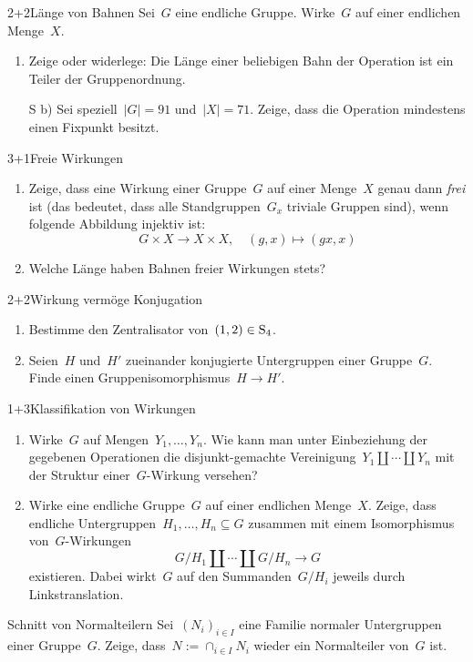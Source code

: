 \documentclass{algblatt}
\begin{document}

\begin{aufgabe}{2+2}{Länge von Bahnen}
Sei~$G$ eine endliche Gruppe. Wirke~$G$ auf einer endlichen Menge~$X$.
\begin{enumerate}
\item Zeige oder widerlege: Die Länge einer beliebigen Bahn der Operation ist
ein Teiler der Gruppenordnung.
\item[S b)]
Sei speziell~$|G| = 91$ und~$|X| = 71$. Zeige, dass die Operation mindestens
einen Fixpunkt besitzt.
\end{enumerate}
\end{aufgabe}

\begin{aufgabe}{3+1}{Freie Wirkungen}
\begin{enumerate}
\item Zeige, dass eine Wirkung einer Gruppe~$G$ auf einer Menge~$X$
genau dann \emph{frei} ist (das bedeutet, dass alle
Standgruppen~$G_x$ triviale Gruppen sind), wenn folgende Abbildung injektiv
ist:
\[ G \times X \longrightarrow X \times X, \quad
  (g,x) \mapsto (gx, x) \]
\item Welche Länge haben Bahnen freier Wirkungen stets?
\end{enumerate}
\end{aufgabe}

\begin{aufgabe}{2+2}{Wirkung vermöge Konjugation}
\begin{enumerate}
\item Bestimme den Zentralisator von~$(1,2) \in \mathrm{S}_4$.
\item Seien~$H$ und~$H'$ zueinander konjugierte Untergruppen einer Gruppe~$G$.
Finde einen Gruppenisomorphismus~$H \to H'$.
\end{enumerate}
\end{aufgabe}

\begin{aufgabe}{1+3}{Klassifikation von Wirkungen}
\begin{enumerate}
\item Wirke~$G$ auf Mengen~$Y_1,\ldots,Y_n$. Wie kann man unter Einbeziehung
der gegebenen Operationen die disjunkt-gemachte
Vereinigung~$Y_1 \amalg \cdots \amalg Y_n$ mit der Struktur einer~$G$-Wirkung versehen?
\item
Wirke eine endliche Gruppe~$G$ auf einer endlichen Menge~$X$. Zeige, dass
endliche Untergruppen~$H_1,\ldots,H_n \subseteq G$ zusammen mit einem Isomorphismus
von~$G$-Wirkungen
\[ G/H_1 \amalg \cdots \amalg G/H_n \longrightarrow G \]
existieren. Dabei wirkt~$G$ auf den Summanden~$G/H_i$ jeweils durch
Linkstranslation.
\end{enumerate}
\end{aufgabe}

\begin{aufgabe}{4}{Schnitt von Normalteilern}
Sei~$(N_i)_{i \in I}$ eine Familie normaler Untergruppen
einer Gruppe~$G$. Zeige, dass~$N := \cap_{i \in I} N_i$ wieder ein Normalteiler von~$G$
ist.
\end{aufgabe}
\end{document}
